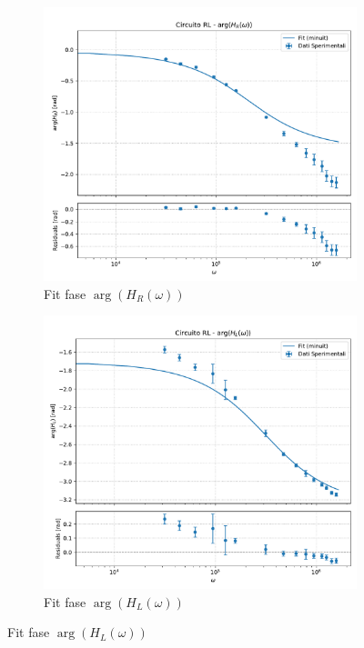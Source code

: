 \documentclass[a4paper]{article}
\begin{document}
\begin{figure}[htbp]
    \vspace{\baselineskip} %

    \begin{subfigure}[b]{0.495\textwidth}
        \centering
        \includegraphics[width=\linewidth]{grafici/rl_fase_hr.pdf}
        \caption{Fit fase $\arg(H_R(\omega))$}
        \label{fig:rl_fase_hr}
    \end{subfigure}
    \hfill %
    \begin{subfigure}[b]{0.495\textwidth}
        \centering
        \includegraphics[width=\linewidth]{grafici/rl_fase_hl.pdf}
        \caption{Fit fase $\arg(H_L(\omega))$}
        \label{fig:rl_fase_hl}
    \end{subfigure}


\end{figure}
\end{document}
